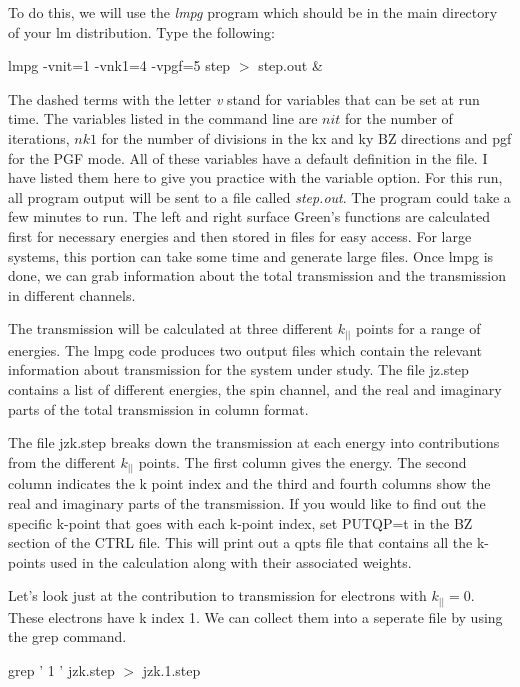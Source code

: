 \documentclass[10pt]{article}
\begin{document}
To do this, we will use the \textit{lmpg} program which should be in the main directory of your lm distribution.  Type the following:

\begin{center}
lmpg -vnit=1 -vnk1=4 -vpgf=5 step $>$ step.out \&
\end{center}

The dashed terms with the letter \textit{v} stand for variables that can be set at run time.  The variables listed in the command line are $nit$ for the number of iterations, $nk1$ for the number of divisions in the kx and ky BZ directions and pgf for the PGF mode.  All of these variables have a default definition in the file.  I have listed them here to give you practice with the variable option.  For this run, all program output will be sent to a file called \textit{step.out}.  The program could take a few minutes to run.  The left and right surface Green's functions are calculated first for necessary energies and then stored in files for easy access.  For large systems, this portion can take some time and generate large files.  Once lmpg is done, we can grab information about the total transmission and the transmission in different channels.

The transmission will be calculated at three different $k_{||}$ points for a range of energies.  The lmpg code produces two output files which contain the relevant information about transmission for the system under study.  The file jz.step contains a list of different energies, the spin channel, and the real and imaginary parts of the total transmission in column format.

The file jzk.step breaks down the transmission at each energy into contributions from the different $k_{||}$ points.  The first column gives the energy.  The second column indicates the k point index and the third and fourth columns show the real and imaginary parts of the transmission.  If you would like to find out the specific k-point that goes with each k-point index, set PUTQP=t in the BZ section of the CTRL file.  This will print out a qpts file that contains all the k-points used in the calculation along with their associated weights.

Let's look just at the contribution to transmission for electrons with $k_{||}=0$.  These electrons have k index 1.  We can collect them into a seperate file by using the grep command.

\begin{center}
grep ' 1 ' jzk.step $>$ jzk.1.step
\end{center}
\end{document}
